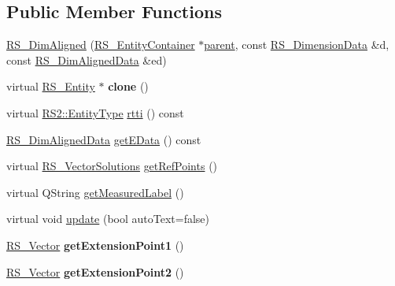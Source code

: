 \subsection*{Public Member Functions}
\begin{DoxyCompactItemize}
\item 
\hyperlink{classRS__DimAligned_a7c327db692a290c781aa2ded9ac4bd0d}{R\-S\-\_\-\-Dim\-Aligned} (\hyperlink{classRS__EntityContainer}{R\-S\-\_\-\-Entity\-Container} $\ast$\hyperlink{classRS__Entity_a80358a8d2fc6739a516a278dc500b49f}{parent}, const \hyperlink{classRS__DimensionData}{R\-S\-\_\-\-Dimension\-Data} \&d, const \hyperlink{classRS__DimAlignedData}{R\-S\-\_\-\-Dim\-Aligned\-Data} \&ed)
\item 
\hypertarget{classRS__DimAligned_a12c89ebe38cf25a55b35e96d673d5286}{virtual \hyperlink{classRS__Entity}{R\-S\-\_\-\-Entity} $\ast$ {\bfseries clone} ()}\label{classRS__DimAligned_a12c89ebe38cf25a55b35e96d673d5286}

\item 
virtual \hyperlink{classRS2_a8f26d1b981e1e85cff16738b43337e6a}{R\-S2\-::\-Entity\-Type} \hyperlink{classRS__DimAligned_a9a4df3d95a21e79f0f9c7f0388bb6035}{rtti} () const 
\item 
\hyperlink{classRS__DimAlignedData}{R\-S\-\_\-\-Dim\-Aligned\-Data} \hyperlink{classRS__DimAligned_aa3268f2ea74892c02e6622605f9e48ae}{get\-E\-Data} () const 
\item 
virtual \hyperlink{classRS__VectorSolutions}{R\-S\-\_\-\-Vector\-Solutions} \hyperlink{classRS__DimAligned_a6003df1ec6a8552e8dcd775ce99e2314}{get\-Ref\-Points} ()
\item 
virtual Q\-String \hyperlink{classRS__DimAligned_a315fa390b9921dfa356121366276dd0d}{get\-Measured\-Label} ()
\item 
virtual void \hyperlink{classRS__DimAligned_a3cb5a7d02f202e6f57ba922ae0122e99}{update} (bool auto\-Text=false)
\item 
\hypertarget{classRS__DimAligned_a3364f94358219f77cc85bdd2d7444952}{\hyperlink{classRS__Vector}{R\-S\-\_\-\-Vector} {\bfseries get\-Extension\-Point1} ()}\label{classRS__DimAligned_a3364f94358219f77cc85bdd2d7444952}

\item 
\hypertarget{classRS__DimAligned_a0cf8dd7e0b65f84f15a73ff36af000c2}{\hyperlink{classRS__Vector}{R\-S\-\_\-\-Vector} {\bfseries get\-Extension\-Point2} ()}\label{classRS__DimAligned_a0cf8dd7e0b65f84f15a73ff36af000c2}


\end{DoxyCompactItemize}
